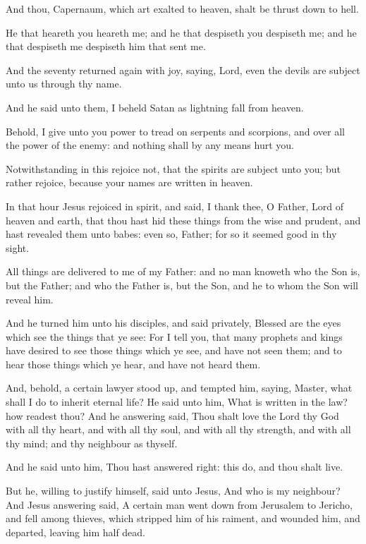 \Verse And thou, Capernaum, which art exalted to heaven, shalt be thrust down to hell.

\Verse He that heareth you heareth me; and he that despiseth you despiseth me; and he that despiseth me despiseth him that sent me.

\Verse And the seventy returned again with joy, saying, Lord, even the devils are subject unto us through thy name.

\Verse And he said unto them, I beheld Satan as lightning fall from heaven.

\Verse Behold, I give unto you power to tread on serpents and scorpions, and over all the power of the enemy: and nothing shall by any means hurt you.

\Verse Notwithstanding in this rejoice not, that the spirits are subject unto you; but rather rejoice, because your names are written in heaven.

\Verse In that hour Jesus rejoiced in spirit, and said, I thank thee, O Father, Lord of heaven and earth, that thou hast hid these things from the wise and prudent, and hast revealed them unto babes: even so, Father; for so it seemed good in thy sight.

\Verse All things are delivered to me of my Father: and no man knoweth who the Son is, but the Father; and who the Father is, but the Son, and he to whom the Son will reveal him.

\Verse And he turned him unto his disciples, and said privately, Blessed are the eyes which see the things that ye see: \Verse For I tell you, that many prophets and kings have desired to see those things which ye see, and have not seen them; and to hear those things which ye hear, and have not heard them.

\Verse And, behold, a certain lawyer stood up, and tempted him, saying, Master, what shall I do to inherit eternal life?  \Verse He said unto him, What is written in the law? how readest thou?  \Verse And he answering said, Thou shalt love the Lord thy God with all thy heart, and with all thy soul, and with all thy strength, and with all thy mind; and thy neighbour as thyself.

\Verse And he said unto him, Thou hast answered right: this do, and thou shalt live.

\Verse But he, willing to justify himself, said unto Jesus, And who is my neighbour?  \Verse And Jesus answering said, A certain man went down from Jerusalem to Jericho, and fell among thieves, which stripped him of his raiment, and wounded him, and departed, leaving him half dead.

